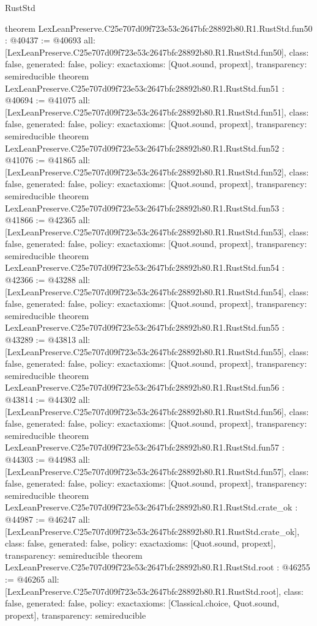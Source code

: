 \begin{lexlean}{RustStd}
\begin{coremodule}
{}
theorem LexLeanPreserve.C25e707d09f723e53c2647bfc28892b80.R1.RustStd.fun50 : @40437 := @40693 {
  all: [LexLeanPreserve.C25e707d09f723e53c2647bfc28892b80.R1.RustStd.fun50],
  class: false,
  generated: false,
  policy: exact{axioms: [Quot.sound, propext]},
  transparency: semireducible
}
theorem LexLeanPreserve.C25e707d09f723e53c2647bfc28892b80.R1.RustStd.fun51 : @40694 := @41075 {
  all: [LexLeanPreserve.C25e707d09f723e53c2647bfc28892b80.R1.RustStd.fun51],
  class: false,
  generated: false,
  policy: exact{axioms: [Quot.sound, propext]},
  transparency: semireducible
}
theorem LexLeanPreserve.C25e707d09f723e53c2647bfc28892b80.R1.RustStd.fun52 : @41076 := @41865 {
  all: [LexLeanPreserve.C25e707d09f723e53c2647bfc28892b80.R1.RustStd.fun52],
  class: false,
  generated: false,
  policy: exact{axioms: [Quot.sound, propext]},
  transparency: semireducible
}
theorem LexLeanPreserve.C25e707d09f723e53c2647bfc28892b80.R1.RustStd.fun53 : @41866 := @42365 {
  all: [LexLeanPreserve.C25e707d09f723e53c2647bfc28892b80.R1.RustStd.fun53],
  class: false,
  generated: false,
  policy: exact{axioms: [Quot.sound, propext]},
  transparency: semireducible
}
theorem LexLeanPreserve.C25e707d09f723e53c2647bfc28892b80.R1.RustStd.fun54 : @42366 := @43288 {
  all: [LexLeanPreserve.C25e707d09f723e53c2647bfc28892b80.R1.RustStd.fun54],
  class: false,
  generated: false,
  policy: exact{axioms: [Quot.sound, propext]},
  transparency: semireducible
}
theorem LexLeanPreserve.C25e707d09f723e53c2647bfc28892b80.R1.RustStd.fun55 : @43289 := @43813 {
  all: [LexLeanPreserve.C25e707d09f723e53c2647bfc28892b80.R1.RustStd.fun55],
  class: false,
  generated: false,
  policy: exact{axioms: [Quot.sound, propext]},
  transparency: semireducible
}
theorem LexLeanPreserve.C25e707d09f723e53c2647bfc28892b80.R1.RustStd.fun56 : @43814 := @44302 {
  all: [LexLeanPreserve.C25e707d09f723e53c2647bfc28892b80.R1.RustStd.fun56],
  class: false,
  generated: false,
  policy: exact{axioms: [Quot.sound, propext]},
  transparency: semireducible
}
theorem LexLeanPreserve.C25e707d09f723e53c2647bfc28892b80.R1.RustStd.fun57 : @44303 := @44983 {
  all: [LexLeanPreserve.C25e707d09f723e53c2647bfc28892b80.R1.RustStd.fun57],
  class: false,
  generated: false,
  policy: exact{axioms: [Quot.sound, propext]},
  transparency: semireducible
}
theorem LexLeanPreserve.C25e707d09f723e53c2647bfc28892b80.R1.RustStd.crate_ok : @44987 := @46247 {
  all: [LexLeanPreserve.C25e707d09f723e53c2647bfc28892b80.R1.RustStd.crate_ok],
  class: false,
  generated: false,
  policy: exact{axioms: [Quot.sound, propext]},
  transparency: semireducible
}
theorem LexLeanPreserve.C25e707d09f723e53c2647bfc28892b80.R1.RustStd.root : @46255 := @46265 {
  all: [LexLeanPreserve.C25e707d09f723e53c2647bfc28892b80.R1.RustStd.root],
  class: false,
  generated: false,
  policy: exact{axioms: [Classical.choice, Quot.sound, propext]},
  transparency: semireducible
}


\end{coremodule}
\end{lexlean}

